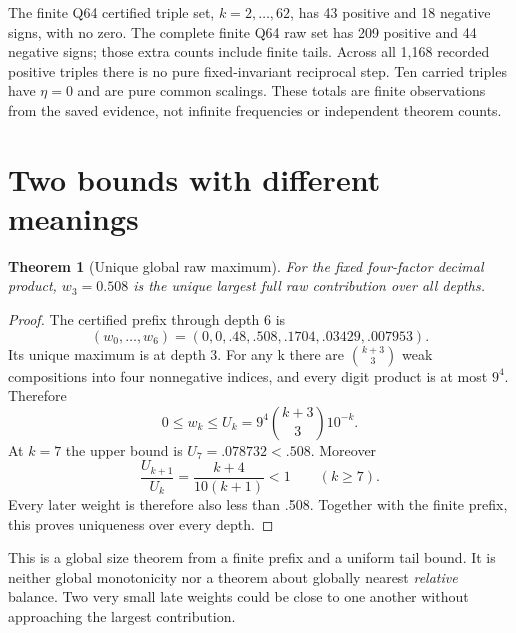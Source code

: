 \documentclass[11pt,a4paper]{article}
\newtheorem{theorem}{Theorem}[section]
\begin{document}
The finite Q64 certified triple set, $k=2,\ldots,62$, has 43 positive and 18 negative signs, with no zero. The complete finite Q64 raw set has 209 positive and 44 negative signs; those extra counts include finite tails. Across all 1,168 recorded positive triples there is no pure fixed-invariant reciprocal step. Ten carried triples have $\eta=0$ and are pure common scalings. These totals are finite observations from the saved evidence, not infinite frequencies or independent theorem counts.

\clearpage
\section{Two bounds with different meanings}
\label{sec:bounds}
\begin{theorem}[Unique global raw maximum]
For the fixed four-factor decimal product, $w_3=0.508$ is the unique largest full raw contribution over all depths.
\end{theorem}
\begin{proof}
The certified prefix through depth 6 is
\begin{equation}
(w_0,\ldots,w_6)=(0,0,.48,.508,.1704,.03429,.007953).
\label{eq:peakprefix}
\end{equation}
Its unique maximum is at depth 3. For any k there are $\binom{k+3}{3}$ weak compositions into four nonnegative indices, and every digit product is at most $9^4$. Therefore
\begin{equation}
0\le w_k\le U_k=9^4\binom{k+3}{3}10^{-k}.
\label{eq:U}
\end{equation}
At $k=7$ the upper bound is $U_7=.078732<.508$. Moreover
\begin{equation}
\frac{U_{k+1}}{U_k}=\frac{k+4}{10(k+1)}<1\qquad(k\ge7).
\label{eq:Uratio}
\end{equation}
Every later weight is therefore also less than .508. Together with the finite prefix, this proves uniqueness over every depth.
\end{proof}
This is a global size theorem from a finite prefix and a uniform tail bound. It is neither global monotonicity nor a theorem about globally nearest \emph{relative} balance. Two very small late weights could be close to one another without approaching the largest contribution.
\end{document}
